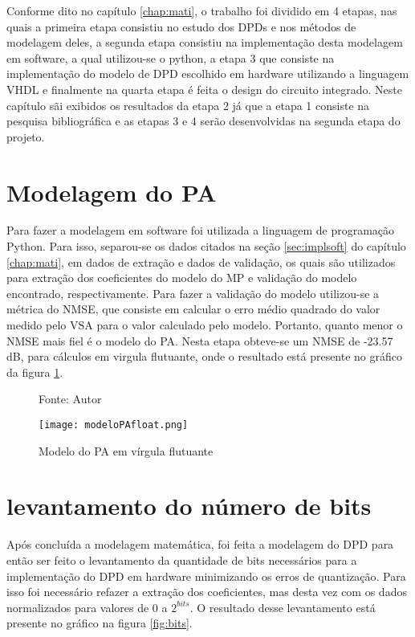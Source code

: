 Conforme dito no capítulo \ref{chap:mati}, o trabalho foi dividido em 4 etapas, nas quais a primeira etapa consistiu no estudo dos DPDs e nos métodos de modelagem deles, a segunda etapa consistiu na implementação desta modelagem em software, a qual utilizou-se o python, a etapa 3 que consiste na implementação do modelo de DPD escolhido em hardware utilizando a linguagem VHDL e finalmente na quarta etapa é feita o design do circuito integrado.
Neste capítulo sãi exibidos os resultados da etapa 2 já que a etapa 1 consiste na pesquisa bibliográfica e as etapas 3 e 4 serão desenvolvidas na segunda etapa do projeto.

\section{Modelagem do PA}

Para fazer a modelagem em software foi utilizada a linguagem de programação Python. Para isso, separou-se os dados citados na seção \ref{sec:implsoft} do capítulo \ref{chap:mati}, em dados de extração e dados de validação, os quais são utilizados para extração dos coeficientes do modelo do MP e validação do modelo encontrado, respectivamente. Para fazer a validação do modelo utilizou-se a métrica do NMSE, que consiste em calcular o erro médio quadrado do valor medido pelo VSA para o valor calculado pelo modelo. Portanto, quanto menor o NMSE mais fiel é o modelo do PA. Nesta etapa obteve-se um NMSE de -23.57 dB, para cálculos em virgula flutuante, onde o resultado está presente no gráfico da figura \ref{fig:modelopafloat}.

\begin{figure}[ht!]
    \centering
    \captionsetup{justification=centering}
    \caption*{Fonte: Autor}
    \texttt{[image: modeloPAfloat.png]}
    \caption{Modelo do PA em vírgula flutuante}
    \label{fig:modelopafloat}
\end{figure}

\section{levantamento do número de bits}

Após concluída a modelagem matemática, foi feita a modelagem do DPD para então ser feito o levantamento da quantidade de bits necessários para a implementação do DPD em hardware minimizando os erros de quantização. 
Para isso foi necessário refazer a extração dos coeficientes, mas desta vez com os dados normalizados para valores de 0 a $2^{bits}$.  
O resultado desse levantamento está presente no gráfico na figura \ref{fig:bits}.

